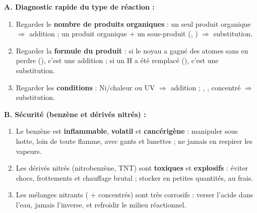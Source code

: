 \documentclass[11pt]{article}
\newcommand{\cle}[1]{{\popxbold\color{popdark}#1}}
\begin{document}
\begin{methode}
\textbf{A. Diagnostic rapide du type de réaction :}
\begin{enumerate}
\item Regarder le \textbf{nombre de produits organiques} : un seul produit organique $\Rightarrow$ \cle{addition} ; un produit organique $+$ un sous-produit (, ) $\Rightarrow$ \cle{substitution}.
\item Regarder la \textbf{formule du produit} : si le noyau a gagné des atomes sans en perdre (), c'est une addition ; si un H a été remplacé (), c'est une substitution.
\item Regarder les \textbf{conditions} : Ni/chaleur ou UV $\Rightarrow$ addition ; , ,  concentré $\Rightarrow$ substitution.
\end{enumerate}
\textbf{B. Sécurité (benzène et dérivés nitrés) :}
\begin{enumerate}
\item Le benzène est \textbf{inflammable}, \textbf{volatil} et \textbf{cancérigène} : manipuler sous hotte, loin de toute flamme, avec gants et lunettes ; ne jamais en respirer les vapeurs.
\item Les dérivés nitrés (nitrobenzène, TNT) sont \textbf{toxiques} et \textbf{explosifs} : éviter chocs, frottements et chauffage brutal ; stocker en petites quantités, au frais.
\item Les mélanges nitrants ( +  concentrés) sont très corrosifs : verser l'acide dans l'eau, jamais l'inverse, et refroidir le milieu réactionnel.
\end{enumerate}
\end{methode}
\end{document}
